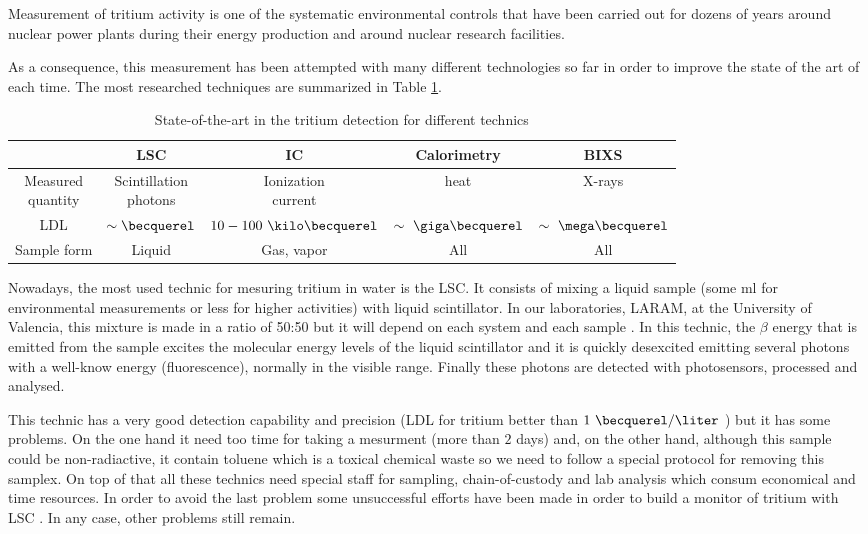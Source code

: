 Measurement of tritium activity is one of the systematic environmental controls that have been carried out for dozens of years around nuclear power plants during their energy production and around nuclear research facilities.

As a consequence, this measurement has been attempted with many different technologies so far in order to improve the state of the art of each time. The most researched techniques are summarized in Table \ref{tab:DifferentThecnics}.

\begin{table}[htbp]
\begin{center}
\begin{tabular}{|c|c|c|c|c|}
\hline
 & LSC & IC & Calorimetry & BIXS\\
\hline \hline \hline
\parbox{5em}{\centering Measured\\ quantity} & \parbox{5em}{\centering Scintillation\\ photons} &  \parbox{5em}{\centering Ionization\\ current} & heat & X-rays\\ \hline
LDL & $\sim\becquerel$ & $10-100~\kilo\becquerel$ & $\sim~\giga\becquerel$ & $\sim~\mega\becquerel$ \\ \hline
Sample form & Liquid & Gas, vapor & All & All \\ \hline
\end{tabular}
\caption{State-of-the-art in the tritium detection for different technics}
\label{tab:DifferentThecnics}
\end{center}
\end{table}

Nowadays, the most used technic for mesuring tritium in water is the LSC. It consists of mixing a liquid sample (some ml for environmental measurements or less for higher activities) with liquid scintillator. In our laboratories, LARAM, at the University of Valencia, this mixture is made in a ratio of 50:50 \cite{LSCLARAM} but it will depend on each system and each sample \cite{LSCothers, HofstetterSeveral}. In this technic, the $\beta$ energy that is emitted from the sample excites the molecular energy levels of the liquid scintillator and it is quickly desexcited emitting several photons with a well-know energy (fluorescence), normally in the visible range. Finally these photons are detected with photosensors, processed and analysed.

This technic has a very good detection capability and precision (LDL for tritium better than $1~\becquerel/\liter$ \cite{0.6Bq_L}) but it has some problems. On the one hand it need too time for taking a mesurment (more than $2$ days) and, on the other hand, although this sample could be non-radiactive, it contain toluene which is a toxical chemical waste so we need to follow a special protocol for removing this samplex. On top of that all these technics need special staff for sampling, chain-of-custody and lab analysis which consum economical and time resources. In order to avoid the last problem some unsuccessful efforts have been made in order to build a monitor of tritium with LSC \cite{OnlineLSC}. In any case, other problems still remain. 

